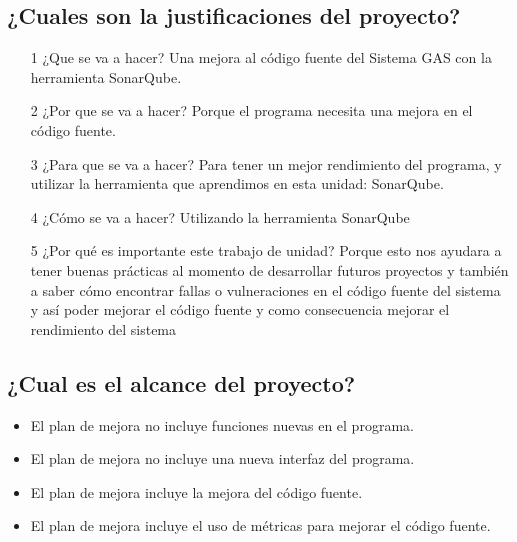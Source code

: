 \documentclass[twoside,twocolumn]{article}
\begin{document}
\subsection{¿Cuales son la justificaciones del proyecto?}

\begin{itemize}
\item[1]¿Que se va a hacer? 
\newline
\newline
Una mejora al código fuente del Sistema GAS con la herramienta SonarQube. 
\newline
\item[2]¿Por que se va a hacer? 
\newline
\newline
Porque el programa necesita una mejora en el código fuente. 
\newline
\item[3]¿Para que se va a hacer? 
\newline
\newline
Para tener un mejor rendimiento del programa, y utilizar la herramienta que aprendimos en esta unidad: SonarQube. 
\newline
\item[4]¿Cómo se va a hacer? 
\newline
\newline
Utilizando la herramienta SonarQube 
\newline
\item[5]¿Por qué es importante este trabajo de unidad? 
\newline
\newline
Porque esto nos ayudara a tener buenas prácticas al momento de desarrollar futuros proyectos y también a saber cómo encontrar fallas o vulneraciones en el código fuente del sistema y así poder mejorar el código fuente y como consecuencia mejorar el rendimiento del sistema
\newline
\end{itemize}

\subsection{¿Cual es el alcance del proyecto?}
\begin{itemize}
\item El plan de mejora no incluye funciones nuevas en el programa. 
\newline
\item El plan de mejora no incluye una nueva interfaz del programa. 
\newline
\item El plan de mejora incluye la mejora del código fuente. 
\newline
\item El plan de mejora incluye el uso de métricas para mejorar el código fuente. 
\end{itemize}
\end{document}
